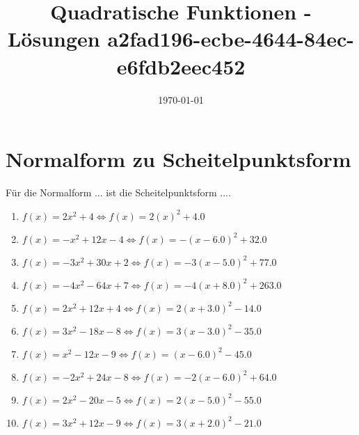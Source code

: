 \documentclass{article}%
\title{Quadratische Funktionen - Lösungen \newline a2fad196-ecbe-4644-84ec-e6fdb2eec452}%
\date{\today}%
\begin{document}
%
\normalsize%
\maketitle%
\section{Normalform zu Scheitelpunktsform}%
\label{sec:NormalformzuScheitelpunktsform}%
Für die Normalform ... ist die Scheitelpunktsform ....%
\begin{enumerate}[label=\alph*)]%
\item%
\newline\vspace{0.5cm}$f(x)=2x^2 + 4\Leftrightarrow f(x)=2(x)^2 +4.0$%
\item%
\newline\vspace{0.5cm}$f(x)=-x^2 + 12x - 4\Leftrightarrow f(x)=-(x-6.0)^2 +32.0$%
\item%
\newline\vspace{0.5cm}$f(x)=-3x^2 + 30x + 2\Leftrightarrow f(x)=-3(x-5.0)^2 +77.0$%
\item%
\newline\vspace{0.5cm}$f(x)=-4x^2 - 64x + 7\Leftrightarrow f(x)=-4(x+8.0)^2 +263.0$%
\item%
\newline\vspace{0.5cm}$f(x)=2x^2 + 12x + 4\Leftrightarrow f(x)=2(x+3.0)^2 -14.0$%
\item%
\newline\vspace{0.5cm}$f(x)=3x^2 - 18x - 8\Leftrightarrow f(x)=3(x-3.0)^2 -35.0$%
\item%
\newline\vspace{0.5cm}$f(x)=x^2 - 12x - 9\Leftrightarrow f(x)=(x-6.0)^2 -45.0$%
\item%
\newline\vspace{0.5cm}$f(x)=-2x^2 + 24x - 8\Leftrightarrow f(x)=-2(x-6.0)^2 +64.0$%
\item%
\newline\vspace{0.5cm}$f(x)=2x^2 - 20x - 5\Leftrightarrow f(x)=2(x-5.0)^2 -55.0$%
\item%
\newline\vspace{0.5cm}$f(x)=3x^2 + 12x - 9\Leftrightarrow f(x)=3(x+2.0)^2 -21.0$%
\end{enumerate}
\end{document}
